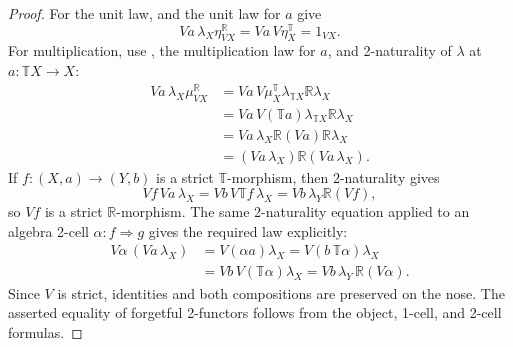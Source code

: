 \documentclass[11pt]{article}
\theoremstyle{plain}
\theoremstyle{definition}
\theoremstyle{remark}
\numberwithin{equation}{section}
\begin{document}
\begin{proof}
For the unit law,  and the unit law for
$a$ give
\begin{equation*}
  Va\,\lambda_X\eta^{\mathbb R}_{VX}
  =Va\,V\eta^{\mathbb T}_X
  =1_{VX}.
\end{equation*}
For multiplication, use
, the multiplication law for
$a$, and 2-naturality of $\lambda$ at
$a\colon\mathbb T X\to X$:
\begin{align*}
Va\,\lambda_X\mu^{\mathbb R}_{VX}
  &=Va\,V\mu^{\mathbb T}_X
      \lambda_{\mathbb T X}\mathbb R\lambda_X\\
  &=Va\,V(\mathbb T a)
      \lambda_{\mathbb T X}\mathbb R\lambda_X\\
  &=Va\,\lambda_X\mathbb R(Va)\mathbb R\lambda_X\\
  &=(Va\,\lambda_X)\mathbb R(Va\,\lambda_X).
\end{align*}
If $f\colon(X,a)\to(Y,b)$ is a strict $\mathbb T$-morphism, then
2-naturality gives
\begin{equation*}
  Vf\,Va\,\lambda_X
  =Vb\,V\mathbb T f\,\lambda_X
  =Vb\,\lambda_Y\mathbb R(Vf),
\end{equation*}
so $Vf$ is a strict $\mathbb R$-morphism.  The same 2-naturality
equation applied to an algebra 2-cell
$\alpha\colon f\Rightarrow g$ gives the required law explicitly:
\begin{align*}
V\alpha\,(Va\,\lambda_X)
  &=V(\alpha a)\lambda_X
   =V(b\,\mathbb T\alpha)\lambda_X\\
  &=Vb\,V(\mathbb T\alpha)\lambda_X
   =Vb\,\lambda_Y\,\mathbb R(V\alpha).
\end{align*}
Since $V$ is strict, identities and both compositions are preserved on
the nose.  The asserted equality of forgetful 2-functors follows from
the object, 1-cell, and 2-cell formulas.
\end{proof}
\end{document}
